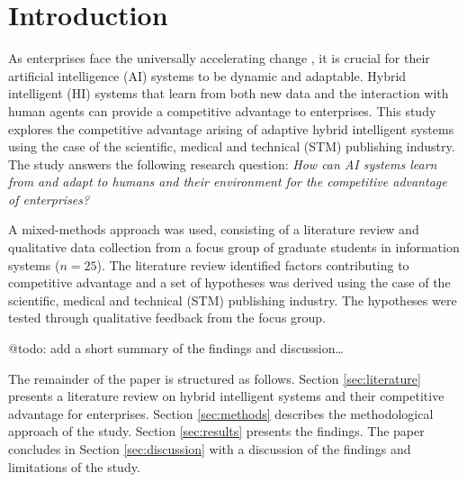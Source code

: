 \section{Introduction}
\label{sec:introduction}

As enterprises face the universally accelerating change \citep{@eliazarUniversalityAcceleratingChange2018}, it
is crucial for their artificial intelligence (AI) systems to be dynamic and adaptable. Hybrid intelligent (HI)
systems that learn from both new data and the interaction with human agents can provide a competitive advantage
to enterprises. This study explores the competitive advantage arising of adaptive hybrid intelligent systems
using the case of the scientific, medical and technical (STM) publishing industry. The study answers the
following research question: \textit{How can AI systems learn from and adapt to humans and their environment
for the competitive advantage of enterprises?}

A mixed-methods approach was used, consisting of a literature review and qualitative data collection from
a focus group of graduate students in information systems ($n = 25$). The literature review identified factors
contributing to competitive advantage and a set of hypotheses was derived using the case of the scientific,
medical and technical (STM) publishing industry. The hypotheses were tested through qualitative feedback
from the focus group.

{\color{purple} @todo: add a short summary of the findings and discussion\dots}

The remainder of the paper is structured as follows. Section \ref{sec:literature} presents a literature review
on hybrid intelligent systems and their competitive advantage for enterprises. Section \ref{sec:methods} describes
the methodological approach of the study. Section \ref{sec:results} presents the findings. The paper concludes in
Section \ref{sec:discussion} with a discussion of the findings and limitations of the study.